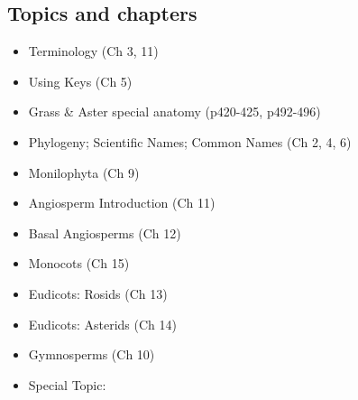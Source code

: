 \documentclass{tufte-handout}
\begin{document}
\begin{fullwidth}
\subsection{Topics and chapters}

\begin{itemize}
	\item Terminology (Ch 3, 11)
	\item Using Keys (Ch 5)
	\item Grass \& Aster special anatomy (p420-425, p492-496)
	\item Phylogeny; Scientific Names; Common Names (Ch 2, 4, 6)
	\item Monilophyta (Ch 9)
	\item Angiosperm Introduction (Ch 11)
	\item Basal Angiosperms (Ch 12)
	\item Monocots (Ch 15)
	\item Eudicots: Rosids (Ch 13)
	\item Eudicots: Asterids (Ch 14)
	\item Gymnosperms (Ch 10)
	\item Special Topic: 
\end{itemize}


\end{fullwidth}
\end{document}

